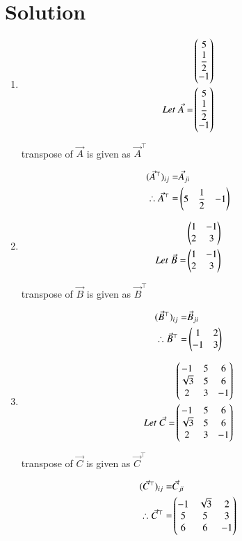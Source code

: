 \documentclass[journal,12pt,twocolumn]{IEEEtran}
\begin{document}
\section{Solution}
\begin{enumerate}
    \item \begin{align} 
    &\begin{pmatrix}5\\ \dfrac{1}{2}\\-1\end{pmatrix} \\
    Let\; \Vec{A}=&\begin{pmatrix}5\\ \dfrac{1}{2}\\-1\end{pmatrix}
    \end{align}
   
          transpose of $\Vec{A}$ is given as $\Vec{A}^{\top}$
    
    \begin{align} 
         (\Vec{A}^{\top})_{i j} =& \Vec{A}_{j i}\\
          \therefore \Vec{A}^{\top} = &\begin{pmatrix}5& \dfrac{1}{2}&-1\end{pmatrix}
    \end{align}
    \item \begin{align} 
    &\begin{pmatrix}1&-1\\2&3\end{pmatrix} \\
    Let\; \Vec{B}=&\begin{pmatrix}1&-1\\2&3\end{pmatrix}
  \end{align}
  
          transpose of $\Vec{B}$ is given as $\Vec{B}^{\top}$
    
    \begin{align}
         (\Vec{B}^{\top})_{i j} =& \Vec{B}_{j i}\\
          \therefore \Vec{B}^{\top} = &\begin{pmatrix}1&2\\-1&3\end{pmatrix}
    \end{align}
     \item \begin{align} 
    &\begin{pmatrix}-1&5&6\\ \sqrt{3}&5&6\\2&3&-1\end{pmatrix} \\
    Let\; \Vec{C}=&\begin{pmatrix}-1&5&6\\ \sqrt{3}&5&6\\2&3&-1\end{pmatrix}
    \end{align}
   
          transpose of $\Vec{C}$ is given as $\Vec{C}^{\top}$
    
    \begin{align}
         (\Vec{C}^{\top})_{i j} =& \Vec{C}_{j i}\\
          \therefore \Vec{C}^{\top} = &\begin{pmatrix}-1& \sqrt{3}&2\\ 5&5&3\\6&6&-1\end{pmatrix}
    \end{align}

\end{enumerate}
\end{document}
